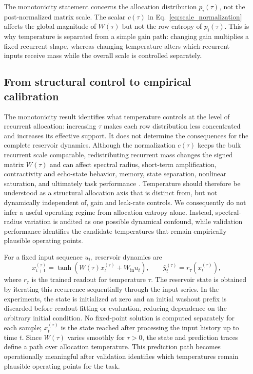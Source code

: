 \documentclass[11pt,a4paper]{article}
\begin{document}
The monotonicity statement concerns the allocation distribution $p_i(\tau)$, not the post-normalized matrix scale. The scalar $c(\tau)$ in Eq.~\eqref{eq:scale_normalization} affects the global magnitude of $W(\tau)$ but not the row entropy of $p_i(\tau)$. This is why temperature is separated from a simple gain path: changing gain multiplies a fixed recurrent shape, whereas changing temperature alters which recurrent inputs receive mass while the overall scale is controlled separately.

\subsection{From structural control to empirical calibration}

The monotonicity result identifies what temperature controls at the level of recurrent allocation: increasing $\tau$ makes each row distribution less concentrated and increases its effective support. It does not determine the consequences for the complete reservoir dynamics. Although the normalization $c(\tau)$ keeps the bulk recurrent scale comparable, redistributing recurrent mass changes the signed matrix $W(\tau)$ and can affect spectral radius, short-term amplification, contractivity and echo-state behavior, memory, state separation, nonlinear saturation, and ultimately task performance \citep{jaeger2001echo,lukosevicius2009reservoir,yildiz2012revisiting}. Temperature should therefore be understood as a structural allocation axis that is distinct from, but not dynamically independent of, gain and leak-rate controls. We consequently do not infer a useful operating regime from allocation entropy alone. Instead, spectral-radius variation is audited as one possible dynamical confound, while validation performance identifies the candidate temperatures that remain empirically plausible operating points.

For a fixed input sequence $u_t$, reservoir dynamics are
\begin{equation}
  x_{t+1}^{(\tau)}=\tanh\left(W(\tau)x_t^{(\tau)}+W_{\mathrm{in}}u_t\right),
  \qquad
  \widehat y_t^{(\tau)}=r_\tau(x_t^{(\tau)}),
\end{equation}
where $r_\tau$ is the trained readout for temperature $\tau$. The reservoir state is obtained by iterating this recurrence sequentially through the input series. In the experiments, the state is initialized at zero and an initial washout prefix is discarded before readout fitting or evaluation, reducing dependence on the arbitrary initial condition. No fixed-point solution is computed separately for each sample; $x_t^{(\tau)}$ is the state reached after processing the input history up to time $t$. Since $W(\tau)$ varies smoothly for $\tau>0$, the state and prediction traces define a path over allocation temperature. This prediction path becomes operationally meaningful after validation identifies which temperatures remain plausible operating points for the task.
\end{document}
